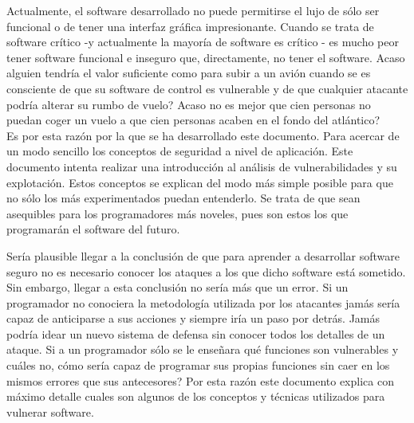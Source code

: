 \documentclass [titlepage, 12pt]{article}
\begin{document}
Actualmente, el software desarrollado no puede permitirse el lujo de s\'olo ser funcional o de tener una interfaz gr\'afica impresionante. Cuando se trata de software cr\'itico -y actualmente la mayor\'ia de software es cr\'itico - es mucho peor tener software funcional e inseguro que, directamente, no tener el software. Acaso alguien tendr\'ia el valor suficiente como para subir a un avi\'on cuando se es consciente de que su software de control es vulnerable y de que cualquier atacante podr\'ia alterar su rumbo de vuelo? Acaso no es mejor que cien personas no puedan coger un vuelo a que cien personas acaben en el fondo del atl\'antico?\\
Es por esta raz\'on por la que se ha desarrollado este documento. Para acercar de un modo sencillo los conceptos de seguridad a nivel de aplicaci\'on. Este documento intenta realizar una introducci\'on al an\'alisis de vulnerabilidades y su explotaci\'on. Estos conceptos se explican del modo m\'as simple posible para que no s\'olo los m\'as experimentados puedan entenderlo. Se trata de que sean asequibles para los programadores m\'as noveles, pues son estos los que programar\'an el software del futuro.\bigskip

Ser\'ia plausible llegar a la conclusi\'on de que para aprender a desarrollar software seguro no es necesario conocer los ataques a los que dicho software est\'a sometido. Sin embargo, llegar a esta conclusi\'on no ser\'ia m\'as que un error. Si un programador no conociera la metodolog\'ia utilizada por los atacantes jam\'as ser\'ia capaz de anticiparse a sus acciones y siempre ir\'ia un paso por detr\'as. Jam\'as podr\'ia idear un nuevo sistema de defensa sin conocer todos los detalles de un ataque. Si a un programador s\'olo se le ense\~nara qu\'e funciones son vulnerables y cu\'ales no, c\'omo ser\'ia capaz de programar sus propias funciones sin caer en los mismos errores que sus antecesores? Por esta raz\'on este documento explica con m\'aximo detalle cuales son algunos de los conceptos y t\'ecnicas utilizados para vulnerar software. \bigskip
\end{document}
